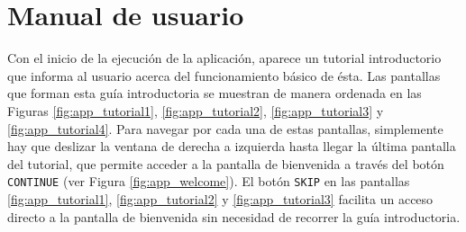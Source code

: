 \chapter{Manual de usuario}
\label{ch:Anexo_Pantallas}

Con el inicio de la ejecución de la aplicación, aparece un tutorial introductorio que informa al usuario acerca del funcionamiento básico de ésta. Las pantallas que forman esta guía introductoria se muestran de manera ordenada en las Figuras \ref{fig:app_tutorial1}, \ref{fig:app_tutorial2}, \ref{fig:app_tutorial3} y \ref{fig:app_tutorial4}. Para navegar por cada una de estas pantallas, simplemente hay que deslizar la ventana de derecha a izquierda hasta llegar la última pantalla del tutorial, que permite acceder a la pantalla de bienvenida a través del botón \texttt{CONTINUE} (ver Figura \ref{fig:app_welcome}). El botón \texttt{SKIP} en las pantallas \ref{fig:app_tutorial1}, \ref{fig:app_tutorial2} y \ref{fig:app_tutorial3} facilita un acceso directo a la pantalla de bienvenida sin necesidad de recorrer la guía introductoria.

